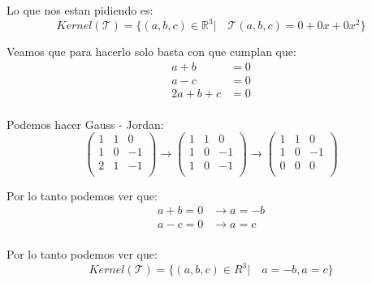\documentclass[12pt]{report}                                %
\begin{document}
            Lo que nos estan pidiendo es:
            \begin{equation*}
                Kernel(\mathscr{T}) = 
                \{(a,b,c)\in \mathbb{R}^3 |\quad \mathscr{T}(a,b,c) = 0+0x+0x^2\}
            \end{equation*}

            Veamos que para hacerlo solo basta con que cumplan que:
            \begin{equation*}
            \begin{split}
                a + b       & = 0 \\
                a - c       & = 0 \\
                2a + b + c  & = 0 \\
            \end{split}
            \end{equation*}

            Podemos hacer Gauss - Jordan:
            \begin{equation*}
                \begin{pmatrix} 1&1&0 \\ 1&0&-1 \\ 2&1&-1 \\\end{pmatrix} \to
                \begin{pmatrix} 1&1&0 \\ 1&0&-1 \\ 1&0&-1 \\\end{pmatrix} \to
                \begin{pmatrix} 1&1&0 \\ 1&0&-1 \\ 0&0&0  \\\end{pmatrix}
            \end{equation*}

            Por lo tanto podemos ver que:
            \begin{equation*}
            \begin{split}
                a + b = 0 &\to a = -b  \\
                a - c = 0 &\to a = c   \\
             \end{split}
            \end{equation*}

            Por lo tanto podemos ver que:
            \begin{equation*}
                Kernel(\mathscr{T}) = \{(a,b,c)\in R^3 |\quad a = -b, a=c\}
            \end{equation*}
\end{document}
